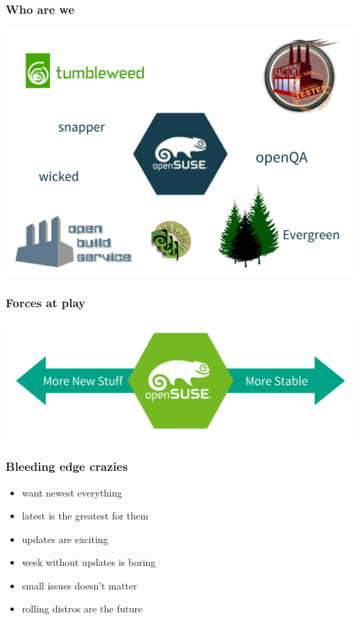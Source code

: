 \documentclass{beamer}
\begin{document}
\begin{frame}
\frametitle{Who are we}
\begin{center}
\includegraphics[width=.75\paperwidth]{projects}
\end{center}
\end{frame}


\begin{frame}[t]
\frametitle{Forces at play}
\begin{center}
\vspace{1cm}
\includegraphics[width=.8\paperwidth]{forces}
\end{center}
\end{frame}

\begin{frame}[t]
\frametitle{Bleeding edge crazies}
\begin{itemize}
\item want newest everything
\item latest is the greatest for them
\item updates are exciting
\item week without updates is boring
\item small issues doesn't matter
\item rolling distros are the future
\end{itemize}
\end{frame}
\end{document}
